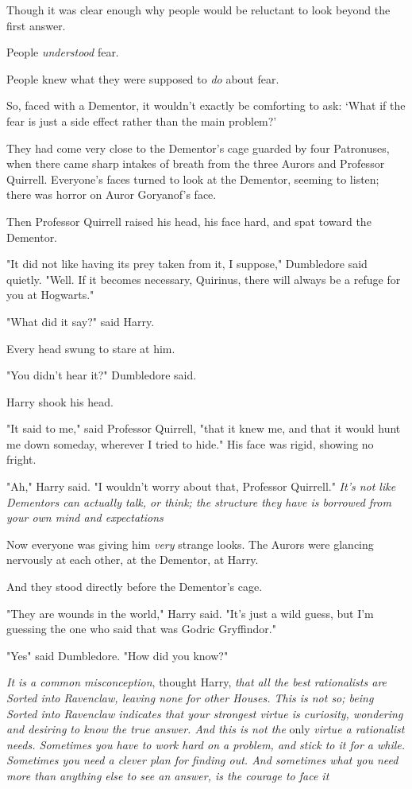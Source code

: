 Though it was clear enough why people would be reluctant to look beyond the
first answer.

People \emph{understood} fear.

People knew what they were supposed to \emph{do} about fear.

So, faced with a Dementor, it wouldn't exactly be comforting to ask: `What if
the fear is just a side effect rather than the main problem?'

They had come very close to the Dementor's cage guarded by four Patronuses,
when there came sharp intakes of breath from the three Aurors and Professor
Quirrell. Everyone's faces turned to look at the Dementor, seeming to listen;
there was horror on Auror Goryanof's face.

Then Professor Quirrell raised his head, his face hard, and spat toward the
Dementor.

"It did not like having its prey taken from it, I suppose," Dumbledore said
quietly. "Well. If it becomes necessary, Quirinus, there will always be a
refuge for you at Hogwarts."

"What did it say?" said Harry.

Every head swung to stare at him.

"You didn't hear it\el?" Dumbledore said.

Harry shook his head.

"It said to me," said Professor Quirrell, "that it knew me, and that it would
hunt me down someday, wherever I tried to hide." His face was rigid, showing no
fright.

"Ah," Harry said. "I wouldn't worry about that, Professor Quirrell." \emph{It's
not like Dementors can actually talk, or think; the structure they have is
borrowed from your own mind and expectations{\el}}

Now everyone was giving him \emph{very} strange looks. The Aurors were glancing
nervously at each other, at the Dementor, at Harry.

And they stood directly before the Dementor's cage.

"They are wounds in the world," Harry said. "It's just a wild guess, but I'm
guessing the one who said that was Godric Gryffindor."

"Yes{\el}" said Dumbledore. "How did you know?"

\emph{It is a common misconception}, thought Harry, \emph{that all the best
rationalists are Sorted into Ravenclaw, leaving none for other Houses. This is
not so; being Sorted into Ravenclaw indicates that your strongest virtue is
curiosity, wondering and desiring to know the true answer. And this is not the}
only \emph{virtue a rationalist needs. Sometimes you have to work hard on a
problem, and stick to it for a while. Sometimes you need a clever plan for
finding out. And sometimes what you need more than anything else to see an
answer, is the courage to face it{\el}}

